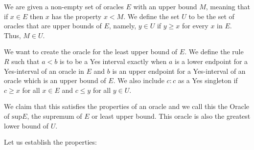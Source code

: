 \documentclass[12pt]{article}
\theoremstyle{remark}
\begin{document}
We are given a non-empty set of oracles $E$ with an upper bound $M$, meaning that if $x \in E$ then $x$ has the property $x < M$. We define the set $U$ to be the set of oracles that are upper bounds of $E$, namely, $y \in U$ if $y \geq x$ for every $x$ in $E$.  Thus, $M \in U$.

We want to create the oracle for the least upper bound of $E$. We define the rule $R$ such that $a\lt b$ is to be a Yes interval exactly when $a$ is a lower endpoint for a Yes-interval of an oracle in $E$ and $b$ is an upper endpoint for a Yes-interval of an oracle which is an upper bound of $E$. We also include $c:c$ as a Yes singleton if $c \geq x$ for all $x \in E$ and $c \leq y$ for all $y\in U$.

We claim that this satisfies the properties of an oracle and we call this the Oracle of $\mathrm{sup} E$, the supremum of $E$ or least upper bound. This oracle is also the greatest lower bound of $U$.

Let us establish the properties: 
\end{document}
